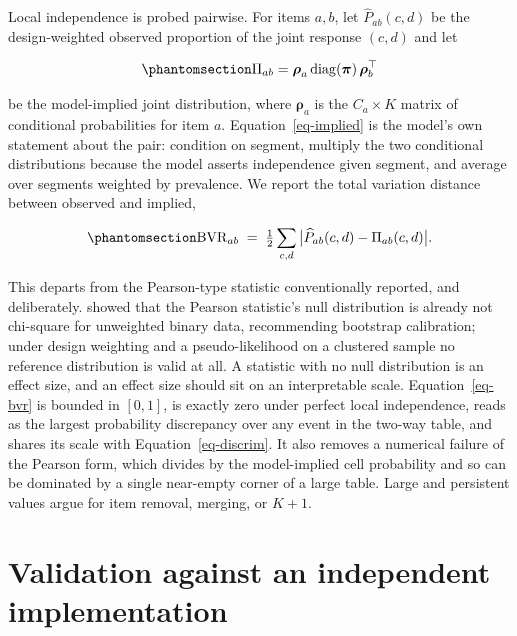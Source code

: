 \documentclass[
  12pt]{article}
\begin{document}
Local independence is probed pairwise. For items \(a, b\), let
\(\widehat{P}_{ab}(c,d)\) be the design-weighted observed proportion of
the joint response \((c,d)\) and let

\begin{equation}\phantomsection\label{eq-implied}{
\Pi_{ab} = \boldsymbol\rho_a \operatorname{diag}(\boldsymbol\pi)\, \boldsymbol\rho_b^{\top}
}\end{equation}

be the model-implied joint distribution, where \(\boldsymbol\rho_a\) is
the \(C_a \times K\) matrix of conditional probabilities for item \(a\).
Equation~\ref{eq-implied} is the model's own statement about the pair:
condition on segment, multiply the two conditional distributions because
the model asserts independence given segment, and average over segments
weighted by prevalence. We report the total variation distance between
observed and implied,

\begin{equation}\phantomsection\label{eq-bvr}{
\mathrm{BVR}_{ab} \;=\; \tfrac{1}{2} \sum_{c,d}
\big| \widehat{P}_{ab}(c,d) - \Pi_{ab}(c,d) \big| .
}\end{equation}

This departs from the Pearson-type statistic conventionally reported,
and deliberately. \citet{oberski2013} showed that the Pearson
statistic's null distribution is already not chi-square for unweighted
binary data, recommending bootstrap calibration; under design weighting
and a pseudo-likelihood on a clustered sample no reference distribution
is valid at all. A statistic with no null distribution is an effect
size, and an effect size should sit on an interpretable scale.
Equation~\ref{eq-bvr} is bounded in \([0,1]\), is exactly zero under
perfect local independence, reads as the largest probability discrepancy
over any event in the two-way table, and shares its scale with
Equation~\ref{eq-discrim}. It also removes a numerical failure of the
Pearson form, which divides by the model-implied cell probability and so
can be dominated by a single near-empty corner of a large table. Large
and persistent values argue for item removal, merging, or \(K+1\).

\section{Validation against an independent
implementation}\label{sec-validation}
\end{document}
